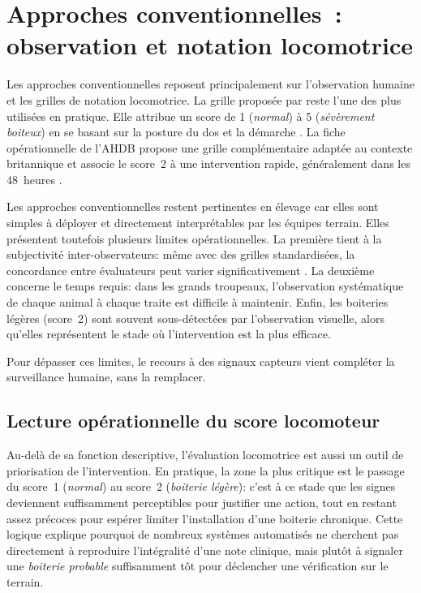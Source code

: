 \section{Approches conventionnelles~: observation et notation locomotrice}

Les approches conventionnelles reposent principalement sur l'observation humaine et les
grilles de notation locomotrice. La grille proposée par \citet{sprecher1997lameness}
reste l'une des plus utilisées en pratique. Elle attribue un score de 1
(\textit{normal}) à 5 (\textit{sévèrement boiteux}) en se basant sur la posture du dos
et la démarche \citep{flower2006gait}. La fiche opérationnelle de l'AHDB propose une
grille complémentaire adaptée au contexte britannique et associe le score~2 à une
intervention rapide, généralement dans les 48~heures
\citep{ahdb_mobility_score_sheet_48h_score2}.

Les approches conventionnelles restent pertinentes en élevage car elles sont simples à
déployer et directement interprétables par les équipes terrain. Elles présentent toutefois
plusieurs limites opérationnelles. La première tient à la subjectivité inter-observateurs: même avec
des grilles standardisées, la concordance entre évaluateurs peut varier significativement
\citep{flower2006effect,schlageter2014validation}. La deuxième concerne le temps requis:
dans les grands troupeaux, l'observation systématique de chaque animal à chaque traite est
difficile à maintenir. Enfin, les boiteries légères (score~2) sont souvent sous-détectées
par l'observation visuelle, alors qu'elles représentent le stade où l'intervention est la
plus efficace.

Pour dépasser ces limites, le recours à des signaux capteurs vient compléter la
surveillance humaine, sans la remplacer.

\subsection{Lecture opérationnelle du score locomoteur}
Au-delà de sa fonction descriptive, l'évaluation locomotrice est aussi un outil de
priorisation de l'intervention. En pratique, la zone la plus critique est le passage du score~1
(\textit{normal}) au score~2 (\textit{boiterie légère}): c'est à ce stade que les signes
deviennent suffisamment perceptibles pour justifier une action, tout en restant assez précoces
pour espérer limiter l'installation d'une boiterie chronique. Cette logique explique
pourquoi de nombreux systèmes automatisés ne cherchent pas directement à reproduire
l'intégralité d'une note clinique, mais plutôt à signaler une \textit{boiterie probable}
suffisamment tôt pour déclencher une vérification sur le terrain.

